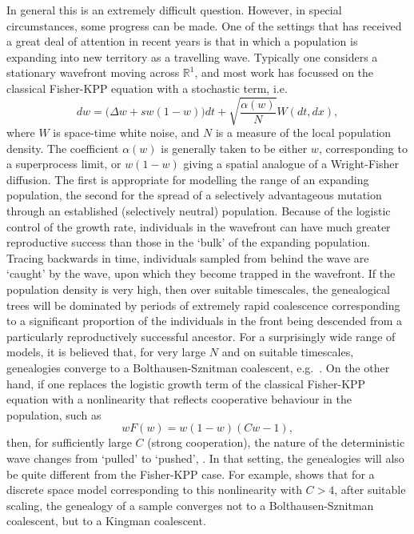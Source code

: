\documentclass[12pt]{article}
\newcommand{\IR}{\mathbb R}
\begin{document}
In general this is an extremely difficult question. However, in special
circumstances, some progress can be made. One of the settings that
has received a great deal of attention in recent years is that in which 
a population is expanding into new territory as a travelling wave. 
Typically one considers a stationary wavefront moving across $\IR^1$, and
most work has focussed on the classical Fisher-KPP equation with a 
stochastic term, i.e.
$$dw=\big(\Delta w +sw(1-w)\Big)dt +\sqrt{\frac{\alpha(w)}{N}}W(dt,dx),$$
where $W$ is space-time white noise, and $N$ is a measure of the 
local population density. The coefficient
$\alpha(w)$ is generally taken to be either
$w$, corresponding to a superprocess limit, or $w(1-w)$ giving a 
spatial analogue of a Wright-Fisher diffusion. The first is 
appropriate for modelling the range of an expanding population,
the second for the spread of a selectively advantageous 
mutation through an established (selectively neutral) population. 
Because of the logistic control of the growth rate,
individuals in the wavefront can have much greater reproductive success
than those in the `bulk' of the expanding population. 
Tracing backwards in time, individuals sampled
from behind the wave are `caught' by the wave, upon which they become
trapped in the wavefront. If the population density is very high, then over
suitable timescales, the genealogical trees will be dominated by 
periods of extremely rapid coalescence corresponding to a significant 
proportion of the individuals in the front being descended from a particularly
reproductively successful ancestor. For a surprisingly wide range of models, 
it is believed that, for very large $N$ and on suitable timescales, 
genealogies converge to a 
Bolthausen-Sznitman coalescent, e.g.~\cite{brunet/derrida/mueller/munier:2007}. 
On the other hand, if one replaces the logistic growth term of the classical
Fisher-KPP equation with a nonlinearity that reflects cooperative
behaviour in the population, such as
$$wF(w)=w(1-w)(Cw-1),$$
then, for sufficiently large $C$ (strong cooperation),
the nature of the deterministic
wave changes from `pulled' to `pushed', \cite{birzu/hallatschek/korolev:2017}.
In that setting, the genealogies will also be quite different
from the Fisher-KPP case. For example, \cite{etheridge/penington:2020}
shows that for a discrete space model corresponding to this 
nonlinearity with $C>4$, after suitable scaling, the genealogy of a
sample converges not to a Bolthausen-Sznitman coalescent, but to
a Kingman coalescent. 
\end{document}
